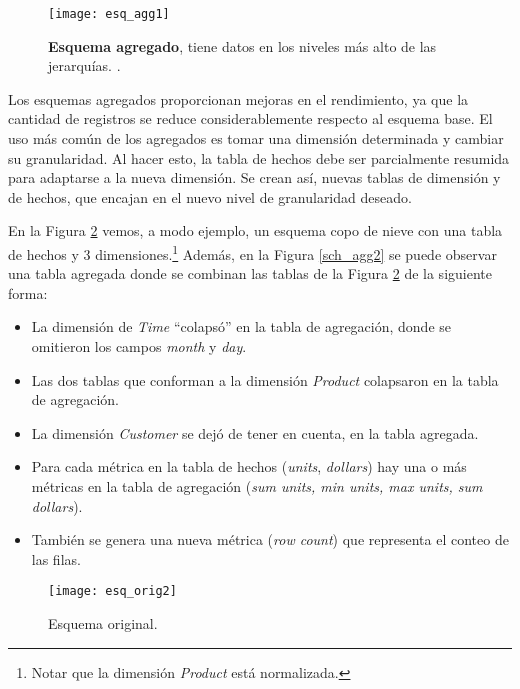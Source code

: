 \documentclass[a4paper,11pt]{article}
\begin{document}
    \begin{figure}
      \begin{center}
        \texttt{[image: esq\_agg1]}
        \caption{\textbf{Esquema agregado}, tiene datos en los niveles más alto de las jerarquías. \cite[p.~172]{nagabhushana}.}
        \label{sch_agg1}
      \end{center}
    \end{figure}
    

    Los esquemas agregados proporcionan mejoras en el rendimiento, ya que la cantidad de registros se reduce considerablemente respecto al esquema base. El
    uso más común de los agregados es tomar una dimensión determinada y cambiar su granularidad. Al hacer esto, la tabla de hechos debe ser parcialmente
    resumida para adaptarse a la nueva dimensión. Se crean así, nuevas tablas de dimensión y de hechos, que encajan en el nuevo nivel de granularidad deseado.
    
    En la Figura \ref{sch_orig2} vemos, a modo ejemplo, un esquema copo de nieve con una tabla de hechos y 3 dimensiones.\footnote{Notar que la
    dimensión \textit{Product} está normalizada.} Además, en la Figura \ref{sch_agg2} se puede observar una tabla agregada donde se combinan las tablas de la
    Figura \ref{sch_orig2} de la siguiente forma:
    
    \begin{itemize}
      \item La dimensión de \textit{Time} ``colapsó'' en la tabla de agregación, donde se omitieron los campos \textit{month} y \textit{day}.
      \item Las dos tablas que conforman a la dimensión \textit{Product} colapsaron en la tabla de agregación.
      \item La dimensión \textit{Customer} se dejó de tener en cuenta, en la tabla agregada.
      \item Para cada métrica en la tabla de hechos (\textit{units}, \textit{dollars}) hay una o más métricas en la tabla de 
      agregación (\textit{sum units, min units, max units, sum dollars}).
      \item También se genera una nueva métrica (\textit{row count}) que representa el conteo de las filas.
    \end{itemize}
    
    \begin{figure}
      \begin{center}
        \texttt{[image: esq\_orig2]}
        \caption{Esquema original. \cite{agg_tables}}
        \label{sch_orig2}
      \end{center}
    \end{figure}
    
\end{document}
